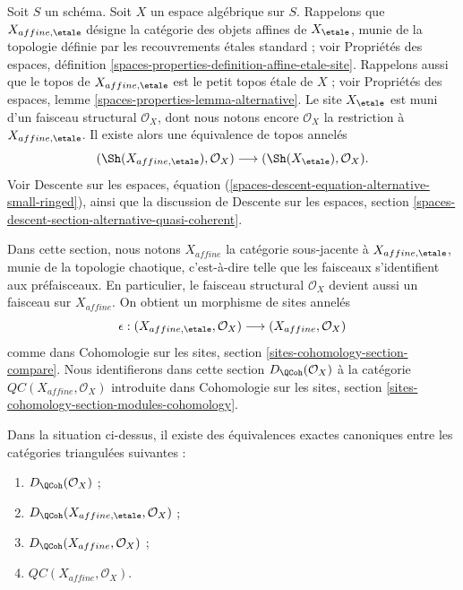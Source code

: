 \noindent
Soit $S$ un sch\'ema. Soit $X$ un espace alg\'ebrique sur $S$.
Rappelons que $X_{affine,\etale}$ d\'esigne la cat\'egorie des objets affines de
$X_\etale$, munie de la topologie d\'efinie par les recouvrements \'etales
standard ; voir Propri\'et\'es des espaces, d\'efinition
\ref{spaces-properties-definition-affine-etale-site}.
Rappelons aussi que le topos de $X_{affine,\etale}$ est le petit topos \'etale
de $X$ ; voir Propri\'et\'es des espaces, lemme
\ref{spaces-properties-lemma-alternative}. Le site $X_\etale$ est muni d'un
faisceau structural $\mathcal{O}_X$, dont nous notons encore
$\mathcal{O}_X$ la restriction \`a $X_{affine,\etale}$. Il existe alors une
\'equivalence de topos annel\'es
$$
(\Sh(X_{affine, \etale}), \mathcal{O}_X)
\longrightarrow
(\Sh(X_\etale), \mathcal{O}_X).
$$
Voir Descente sur les espaces, \'equation
(\ref{spaces-descent-equation-alternative-small-ringed}), ainsi que la discussion de
Descente sur les espaces, section
\ref{spaces-descent-section-alternative-quasi-coherent}.

\medskip\noindent
Dans cette section, nous notons $X_{affine}$ la cat\'egorie sous-jacente \`a
$X_{affine,\etale}$, munie de la topologie chaotique, c'est-\`a-dire telle que
les faisceaux s'identifient aux pr\'efaisceaux. En particulier, le faisceau
structural $\mathcal{O}_X$ devient aussi un faisceau sur $X_{affine}$.
On obtient un morphisme de sites annel\'es
$$
\epsilon :
(X_{affine, \etale}, \mathcal{O}_X)
\longrightarrow
(X_{affine}, \mathcal{O}_X)
$$
comme dans Cohomologie sur les sites, section
\ref{sites-cohomology-section-compare}. Nous identifierons dans cette section
$D_\QCoh(\mathcal{O}_X)$ \`a la cat\'egorie
$\mathit{QC}(X_{affine},\mathcal{O}_X)$ introduite dans Cohomologie sur les
sites, section \ref{sites-cohomology-section-modules-cohomology}.

\begin{lemma}
\label{lemma-DQCoh-alternative-small}
Dans la situation ci-dessus, il existe des \'equivalences exactes canoniques
entre les cat\'egories triangul\'ees suivantes :
\begin{enumerate}
\item $D_\QCoh(\mathcal{O}_X)$ ;
\item $D_\QCoh(X_{affine, \etale}, \mathcal{O}_X)$ ;
\item $D_\QCoh(X_{affine}, \mathcal{O}_X)$ ;
\item $\mathit{QC}(X_{affine}, \mathcal{O}_X)$.
\end{enumerate}
\end{lemma}

